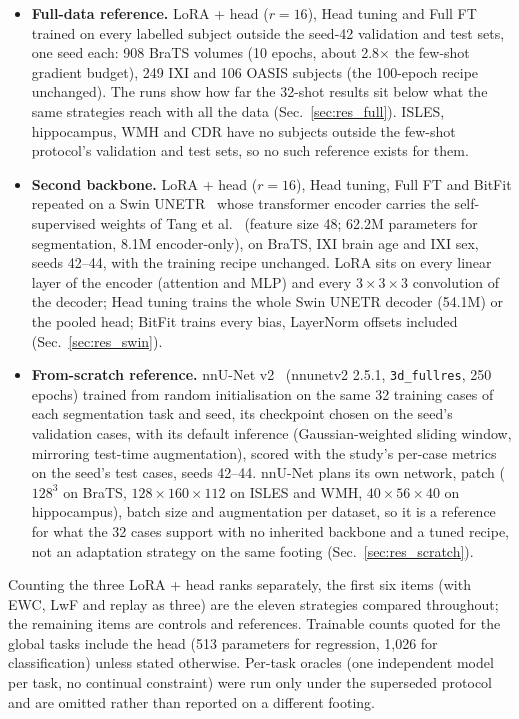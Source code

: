 \iffull\documentclass[journal]{IEEEtran}\else\documentclass[journal,twoside,web]{ieeecolor}\usepackage{generic}\fi
\begin{document}
\begin{itemize}
\item \textbf{Full-data reference.} LoRA + head ($r{=}16$), Head tuning and Full FT trained on every labelled subject outside the seed-42 validation and test sets, one seed each: 908 BraTS volumes (10 epochs, about 2.8$\times$ the few-shot gradient budget), 249 IXI and 106 OASIS subjects (the 100-epoch recipe unchanged). The runs show how far the 32-shot results sit below what the same strategies reach with all the data (Sec.~\ref{sec:res_full}). ISLES, hippocampus, WMH and CDR have no subjects outside the few-shot protocol's validation and test sets, so no such reference exists for them.
\item \textbf{Second backbone.} LoRA + head ($r{=}16$), Head tuning, Full FT and BitFit repeated on a Swin UNETR~\cite{hatamizadeh2022swin} whose transformer encoder carries the self-supervised weights of Tang et al.~\cite{tang2022selfsupervised} (feature size 48; 62.2M parameters for segmentation, 8.1M encoder-only), on BraTS, IXI brain age and IXI sex, seeds 42--44, with the training recipe unchanged. LoRA sits on every linear layer of the encoder (attention and MLP) and every $3{\times}3{\times}3$ convolution of the decoder; Head tuning trains the whole Swin UNETR decoder (54.1M) or the pooled head; BitFit trains every bias, LayerNorm offsets included (Sec.~\ref{sec:res_swin}).
\item \textbf{From-scratch reference.} nnU-Net v2~\cite{isensee2021nnunet} (nnunetv2 2.5.1, \texttt{3d\_fullres}, 250 epochs) trained from random initialisation on the same 32 training cases of each segmentation task and seed, its checkpoint chosen on the seed's validation cases, with its default inference (Gaussian-weighted sliding window, mirroring test-time augmentation), scored with the study's per-case metrics on the seed's test cases, seeds 42--44. nnU-Net plans its own network, patch ($128^3$ on BraTS, $128{\times}160{\times}112$ on ISLES and WMH, $40{\times}56{\times}40$ on hippocampus), batch size and augmentation per dataset, so it is a reference for what the 32 cases support with no inherited backbone and a tuned recipe, not an adaptation strategy on the same footing (Sec.~\ref{sec:res_scratch}).
\end{itemize}
Counting the three LoRA + head ranks separately, the first six items (with EWC, LwF and replay as three) are the eleven strategies compared throughout; the remaining items are controls and references. Trainable counts quoted for the global tasks include the head (513 parameters for regression, 1,026 for classification) unless stated otherwise.\iffull{} Per-task oracles (one independent model per task, no continual constraint) were run only under the superseded protocol and are omitted rather than reported on a different footing.\fi
\end{document}
